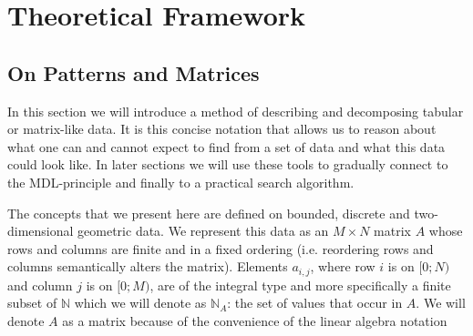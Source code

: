 \documentclass[a4paper,notoc,oneside]{tufte-book}
\begin{document}
\chapter{Theoretical Framework}

\section{On Patterns and Matrices}

In this section we will introduce a method of describing and decomposing tabular or matrix-like data. It is this concise notation that allows us to reason about what one can and cannot expect to find from a set of data and what this data could look like. In later sections we will use these tools to gradually connect to the MDL-principle and finally to a practical search algorithm.

The concepts that we present here are defined on bounded, discrete and two-dimensional geometric data. We represent this data as an $M\times N$ matrix $A$ whose rows and columns are finite and in a fixed ordering (i.e. reordering rows and columns semantically alters the matrix). Elements $a_{i,j}$, where row $i$ is on $[0;N)$ and column $j$ is on $[0;M)$, are of the integral type and more specifically a finite subset of $\mathbb{N}$ which we will denote as $\mathbb{N}_A$: the set of values that occur in $A$. We will denote $A$ as a matrix because of the convenience of the linear algebra notation


\begin{marginfigure}

\label{example1}
\end{marginfigure}
\end{document}
